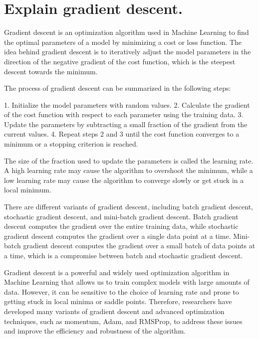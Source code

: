 \section{Explain gradient descent.}
Gradient descent is an optimization algorithm used in Machine Learning to find the optimal parameters of a model by minimizing a cost or loss function. The idea behind gradient descent is to iteratively adjust the model parameters in the direction of the negative gradient of the cost function, which is the steepest descent towards the minimum.

The process of gradient descent can be summarized in the following steps:

1. Initialize the model parameters with random values.
2. Calculate the gradient of the cost function with respect to each parameter using the training data.
3. Update the parameters by subtracting a small fraction of the gradient from the current values.
4. Repeat steps 2 and 3 until the cost function converges to a minimum or a stopping criterion is reached.

The size of the fraction used to update the parameters is called the learning rate. A high learning rate may cause the algorithm to overshoot the minimum, while a low learning rate may cause the algorithm to converge slowly or get stuck in a local minimum.

There are different variants of gradient descent, including batch gradient descent, stochastic gradient descent, and mini-batch gradient descent. Batch gradient descent computes the gradient over the entire training data, while stochastic gradient descent computes the gradient over a single data point at a time. Mini-batch gradient descent computes the gradient over a small batch of data points at a time, which is a compromise between batch and stochastic gradient descent.

Gradient descent is a powerful and widely used optimization algorithm in Machine Learning that allows us to train complex models with large amounts of data. However, it can be sensitive to the choice of learning rate and prone to getting stuck in local minima or saddle points. Therefore, researchers have developed many variants of gradient descent and advanced optimization techniques, such as momentum, Adam, and RMSProp, to address these issues and improve the efficiency and robustness of the algorithm.

